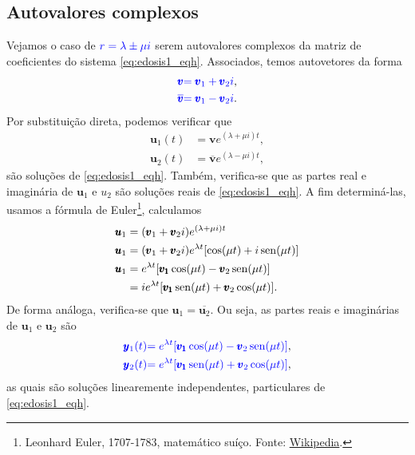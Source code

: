\subsection{Autovalores complexos}

Vejamos o caso de ${\color{blue}r=\lambda  \pm \mu i}$ serem autovalores complexos da matriz de coeficientes do sistema \eqref{eq:edosis1_eqh}. Associados, temos autovetores da forma
\begin{align}
  {\color{blue}\pmb{v}} &{\color{blue}= \pmb{v}_1 + \pmb{v}_2i},\\
  {\color{blue}\overline{\pmb{v}}} &{\color{blue}= \pmb{v}_1 - \pmb{v}_2i}.
\end{align}
Por substituição direta, podemos verificar que
\begin{align}
  \pmb{u}_1(t) &= \pmb{v}e^{(\lambda + \mu i)t},\\
  \pmb{u}_2(t) &= \overline{\pmb{v}}e^{(\lambda - \mu i)t},
\end{align}
são soluções de \eqref{eq:edosis1_eqh}. Também, verifica-se que as partes real e imaginária de $\pmb{u}_1$ e ${u}_2$ são soluções reais de \eqref{eq:edosis1_eqh}. A fim determiná-las, usamos a fórmula de Euler\footnote{Leonhard Euler, 1707-1783, matemático suíço. Fonte: \href{https://en.wikipedia.org/wiki/Leonhard_Euler}{Wikipedia}.}, calculamos
\begin{align}
  \pmb{u}_1 &= (\pmb{v}_1 + \pmb{v}_2i)e^{(\lambda + \mu i)t} \\
  \pmb{u}_1 &= (\pmb{v}_1 + \pmb{v}_2i)e^{\lambda t}[\cos(\mu t) + i\operatorname{sen}(\mu t)] \\
  \pmb{u}_1 &= e^{\lambda t}[\pmb{v_1}\cos(\mu t)-\pmb{v}_2\operatorname{sen}(\mu t)] \\
            &= ie^{\lambda t}[\pmb{v_1}\operatorname{sen}(\mu t) + \pmb{v}_2\cos(\mu t)].
\end{align}
De forma análoga, verifica-se que $\pmb{u}_1 = \overline{\pmb{u}_2}$. Ou seja, as partes reais e imaginárias de $\pmb{u}_1$ e $\pmb{u}_2$ são
\begin{align}
  {\color{blue}\pmb{y}_1(t)} &{\color{blue}= e^{\lambda t}[\pmb{v_1}\cos(\mu t)-\pmb{v}_2\operatorname{sen}(\mu t)]}, \\
  {\color{blue}\pmb{y}_2(t)} &{\color{blue}= e^{\lambda t}[\pmb{v_1}\operatorname{sen}(\mu t)+\pmb{v}_2\cos(\mu t)]},
\end{align}
as quais são soluções linearemente independentes, particulares de \eqref{eq:edosis1_eqh}.

